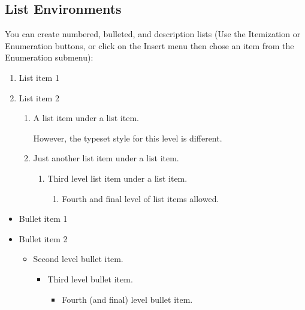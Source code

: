 \documentclass[11pt,a4paper]{amsart}
\theoremstyle{plain}
\numberwithin{equation}{section}
\theoremstyle{definition}
\begin{document}
\subsection{List Environments}

You can create numbered, bulleted, and description lists
(Use the Itemization or Enumeration buttons, or click on the Insert menu
then chose an item from the Enumeration submenu):

\begin{enumerate}
\item List item 1

\item List item 2

	\begin{enumerate}
	\item A list item under a list item.

	However, the typeset style for this level is different.

	\item Just another list item under a list item.

		\begin{enumerate}
		\item Third level list item under a list item.

			\begin{enumerate}
			\item Fourth and final level of list items allowed.
			\end{enumerate}
		\end{enumerate}
	\end{enumerate}
\end{enumerate}

\begin{itemize}
\item Bullet item 1

\item Bullet item 2

		\begin{itemize}
		\item Second level bullet item.

			\begin{itemize}
			\item Third level bullet item.

				\begin{itemize}
				\item Fourth (and final) level bullet item.
				\end{itemize}
			\end{itemize}
		\end{itemize}
\end{itemize}
\end{document}
